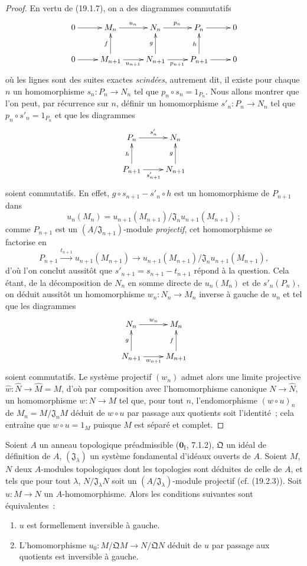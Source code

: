 \begin{proof}
En vertu de (19.1.7), on a des diagrammes commutatifs
\[
  \xymatrix{
    0\ar[r] & M_n\ar[r]^{u_n} & N_n\ar[r]^{p_n} & P_n\ar[r] & 0\\
    0\ar[r] & M_{n+1}\ar[u]^f\ar[r]_{u_{n+1}} &
      N_{n+1}\ar[u]^g\ar[r]_{p_{n+1}} & P_{n+1}\ar[u]^h\ar[r] & 0
  }
\]
où les lignes sont des suites exactes \emph{scindées}, autrement dit, il existe
pour chaque $n$ un homomorphisme $s_n:P_n\to N_n$ tel que
$p_n\circ s_n=1_{P_n}$. Nous allons montrer que l'on peut, par récurrence sur
$n$, définir un homomorphisme $s'_n:P_n\to N_n$ tel que
$p_n\circ s'_n=1_{P_n}$ et que les diagrammes
\[
  \xymatrix{
    P_n\ar[r]^{s'_n} & N_n\\
    P_{n+1}\ar[u]^h\ar[r]_{s'_{n+1}} & N_{n+1}\ar[u]^g
  }
\]
soient commutatifs. En effet, $g\circ s_{n+1}-s'_n\circ h$ est un
homomorphisme de $P_{n+1}$ dans
\[
  u_n(M_n)=u_{n+1}(M_{n+1})/
  \mathfrak J_nu_{n+1}(M_{n+1})~;
\]
comme $P_{n+1}$ est un $(A/\mathfrak J_{n+1})$-module \emph{projectif}, cet
homomorphisme se factorise en
\[
  P_{n+1}\xrightarrow{t_{n+1}}u_{n+1}(M_{n+1})
  \longrightarrow
  u_{n+1}(M_{n+1})/\mathfrak J_nu_{n+1}(M_{n+1}),
\]
d'où l'on conclut aussitôt que $s'_{n+1}=s_{n+1}-t_{n+1}$ répond à la
question. Cela étant, de la décomposition de $N_n$ en somme directe de
$u_n(M_n)$ et de $s'_n(P_n)$, on déduit aussitôt un homomorphisme
$w_n:N_n\to M_n$ inverse à gauche de $u_n$ et tel que les diagrammes
\[
  \xymatrix{
    N_n\ar[r]^{w_n} & M_n\\
    N_{n+1}\ar[u]^g\ar[r]_{w_{n+1}} & M_{n+1}\ar[u]^f
  }
\]
soient commutatifs. Le système projectif $(w_n)$ admet alors une limite
projective $\widehat w:\widehat N\to\widehat M=M$, d'où par composition avec
l'homomorphisme canonique $N\to\widehat N$, un homomorphisme $w:N\to M$ tel
que, pour tout $n$, l'endomorphisme $(w\circ u)_n$ de
$M_n=M/\mathfrak J_nM$ déduit de $w\circ u$ par passage aux quotients soit
l'identité~; cela entraîne que $w\circ u=1_M$ puisque $M$ est séparé et
complet.
\end{proof}

\begin{proposition}[19.1.9]
\label{0.19.1.9-fr}
Soient $A$ un anneau topologique préadmissible ($\mathbf{0}_{\mathrm I}$,
7.1.2), $\mathfrak Q$ un idéal de définition de $A$,
$(\mathfrak J_\lambda)$ un système fondamental d'idéaux ouverts de $A$.
Soient $M$, $N$ deux $A$-modules topologiques dont les topologies sont déduites
de celle de $A$, et tels que pour tout $\lambda$,
$N/\mathfrak J_\lambda N$ soit un $(A/\mathfrak J_\lambda)$-module projectif
(cf. (19.2.3)). Soit $u:M\to N$ un $A$-homomorphisme. Alors les conditions
suivantes sont équivalentes~:
\begin{enumerate}
  \item[a)] $u$ est formellement inversible à gauche.


  \item[b)] L'homomorphisme
  $u_0:M/\mathfrak QM\to N/\mathfrak QN$ déduit de $u$ par passage aux
  quotients est inversible à gauche.
\end{enumerate}
\end{proposition}

